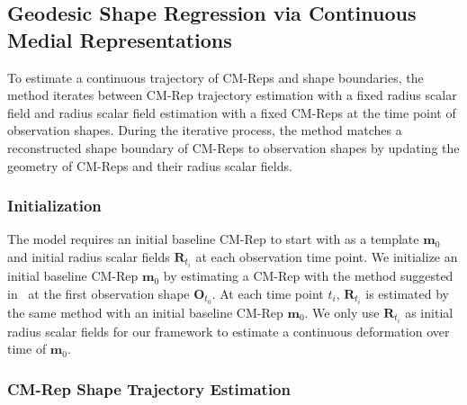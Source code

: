 \documentclass{llncs}
\begin{document}
\subsection{Geodesic Shape Regression via Continuous Medial Representations}
\label{ssec:Regression}

To estimate a continuous trajectory of CM-Reps and shape boundaries, the method iterates between CM-Rep trajectory estimation with a fixed radius scalar field and radius scalar field estimation with a fixed CM-Reps at the time point of observation shapes. During the iterative process, the method matches a reconstructed shape boundary of CM-Reps to observation shapes by updating the geometry of CM-Reps and their radius scalar fields.

\subsubsection{Initialization}
The model requires an initial baseline CM-Rep to start with as a template $\mathbf{m}_0$ and initial radius scalar fields $\mathbf{R}_{t_i}$ at each observation time point. 
We initialize an initial baseline CM-Rep $\mathbf{m}_0$ by estimating a CM-Rep with the method suggested in~\cite{Yushkevich2009} at the first observation shape $\mathbf{O}_{t_0}$.
At each time point $t_i$, $\mathbf{R}_{t_i}$ is estimated by the same method with an initial baseline CM-Rep $\mathbf{m}_0$. We only use $\mathbf{R}_{t_i}$ as initial radius scalar fields for our framework to estimate a continuous deformation over time of $\mathbf{m}_0$.

\subsubsection{CM-Rep Shape Trajectory Estimation}
\label{sssec:GeoUpdate}
\end{document}

